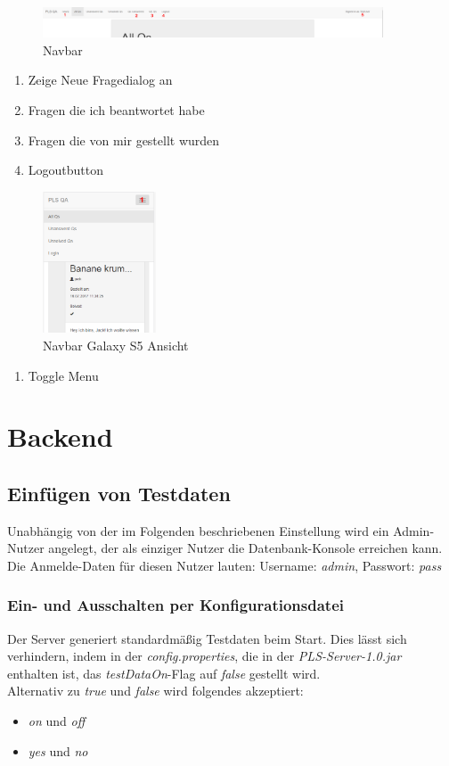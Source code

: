 \documentclass[a4paper]{report}
\begin{document}
\begin{figure}[h!]
	\centering
	\includegraphics[width=0.9\textwidth]{./Bilder/navbarLoggedIn.PNG}
	\caption{Navbar}
	\label{fig:navbar2}
\end{figure}
\centering\begin{enumerate}
	\item Zeige Neue Fragedialog an
	\item Fragen die ich beantwortet habe
	\item Fragen die von mir gestellt wurden
	\item Logoutbutton
\end{enumerate}

\begin{figure}[h!]
	\centering
	\includegraphics[width=0.3\textwidth]{./Bilder/AnsichtGalaxyS5.PNG}
	\caption{Navbar Galaxy S5 Ansicht}
	\label{fig:navbarResponive}
\end{figure}
\centering\begin{enumerate}
	\item Toggle Menu
\end{enumerate}

\part{Backend}
\chapter{Einfügen von Testdaten}
\label{admin}
Unabhängig von der im Folgenden beschriebenen Einstellung wird ein Admin-Nutzer angelegt, der als einziger Nutzer die Datenbank-Konsole erreichen kann. Die Anmelde-Daten für diesen Nutzer lauten: Username: \textit{admin}, Passwort: \textit{pass}
\section{Ein- und Ausschalten per Konfigurationsdatei}
Der Server generiert standardmäßig Testdaten beim Start. Dies lässt sich verhindern, indem in der \textit{config.properties}, die in der \textit{PLS-Server-1.0.jar} enthalten ist, das \textit{testDataOn}-Flag auf \textit{false} gestellt wird.\\
Alternativ zu \textit{true} und \textit{false} wird folgendes akzeptiert:
\begin{itemize}
	\item \textit{on} und \textit{off}
	\item \textit{yes} und \textit{no}
\end{itemize}
\end{document}
